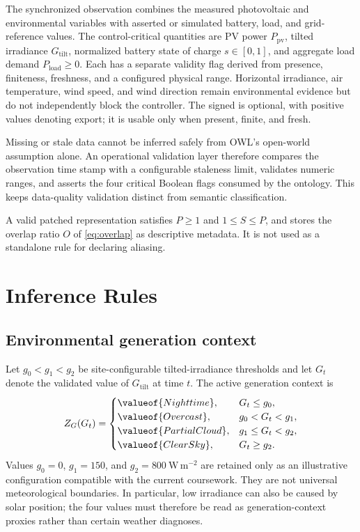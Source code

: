 The synchronized observation combines the measured photovoltaic and environmental variables with asserted or simulated battery, load, and grid-reference values. The control-critical quantities are PV power $P_{\mathrm{pv}}$, tilted irradiance $G_{\mathrm{tilt}}$, normalized battery state of charge $s\in[0,1]$, and aggregate load demand $P_{\mathrm{load}}\geq0$. Each has a separate validity flag derived from presence, finiteness, freshness, and a configured physical range. Horizontal irradiance, air temperature, wind speed, and wind direction remain environmental evidence but do not independently block the controller. The signed  is optional, with positive values denoting export; it is usable only when present, finite, and fresh.

Missing or stale data cannot be inferred safely from OWL's open-world assumption alone. An operational validation layer therefore compares the observation time stamp with a configurable staleness limit, validates numeric ranges, and asserts the four critical Boolean flags consumed by the ontology. This keeps data-quality validation distinct from semantic classification.



A valid patched representation satisfies $P\geq1$ and $1\leq S\leq P$, and stores the overlap ratio $O$ of \autoref{eq:overlap} as descriptive metadata. It is not used as a standalone rule for declaring aliasing.

\section{Inference Rules}

\subsection{Environmental generation context}

Let $g_0<g_1<g_2$ be site-configurable tilted-irradiance thresholds and let $G_t$ denote the validated value of $G_{\mathrm{tilt}}$ at time $t$. The active generation context is
\begin{equation*}
Z_G(G_t)=
\begin{cases}
\valueof{Nighttime}, & G_t\leq g_0,\\
\valueof{Overcast}, & g_0<G_t<g_1,\\
\valueof{PartialCloud}, & g_1\leq G_t<g_2,\\
\valueof{ClearSky}, & G_t\geq g_2.
\end{cases}
\end{equation*}
Values $g_0=0$, $g_1=150$, and $g_2=800\ \mathrm{W\,m^{-2}}$ are retained only as an illustrative configuration compatible with the current coursework. They are not universal meteorological boundaries. In particular, low irradiance can also be caused by solar position; the four values must therefore be read as generation-context proxies rather than certain weather diagnoses.

